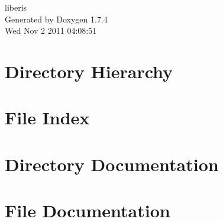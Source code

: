 \documentclass[a4paper]{book}
\begin{document}
\hypersetup{pageanchor=false}
\begin{titlepage}
\vspace*{7cm}
\begin{center}
{\Large liberis }\\
\vspace*{1cm}
{\large Generated by Doxygen 1.7.4}\\
\vspace*{0.5cm}
{\small Wed Nov 2 2011 04:08:51}\\
\end{center}
\end{titlepage}
\clearemptydoublepage
{}
\tableofcontents
\clearemptydoublepage
{}
\hypersetup{pageanchor=true}
\chapter{Directory Hierarchy}

\chapter{File Index}

\chapter{Directory Documentation}



\chapter{File Documentation}












\printindex
\end{document}
